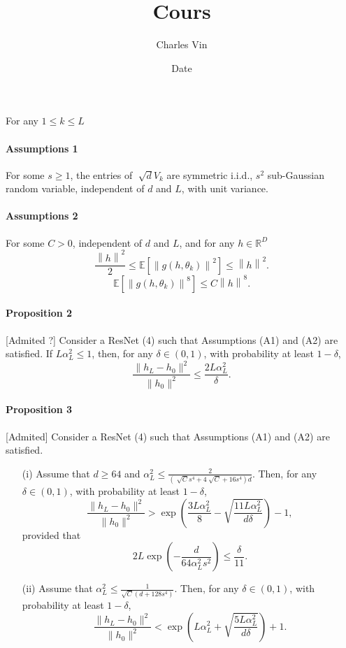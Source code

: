 \documentclass{article}
\title{Cours}
\author{Charles Vin}
\date{Date}
\theoremstyle{plain}%
\theoremstyle{definition}
\theoremstyle{remark}
\begin{document}
For any $ 1 \leq  k \leq L  $ 

\paragraph*{Assumptions 1}
For some $ s \geq 1 $, the entries of $ \sqrt[]{d}V_k $ are symmetric i.i.d., $ s^2 $ sub-Gaussian random variable, independent of $ d $ and $ L $, with unit variance. 

\paragraph*{Assumptions 2}
For some $ C > 0 $, independent of $ d $ and $ L $, and for any $ h \in \mathbb{R}^D  $ 
\[
    \frac{\left\| h \right\| ^2}{2 } \leq  \mathbb{E }[ \left\|  g(h, \theta _ k ) \right\| ^2 ] \leq \left\| h \right\| ^2
.\]
\[
    \mathbb{E } [\left\| g(h, \theta _k)  \right\| ^8 ]\leq C \left\| h  \right\| ^8
.\]

\paragraph*{Proposition 2}[Admited ?]  Consider a ResNet (4) such that Assumptions (A1) and (A2) are satisfied.
If \( L\alpha_L^2 \leq 1 \), then, for any \( \delta \in (0, 1) \), with probability at least \( 1 - \delta \),
\[
\frac{\|h_L - h_0\|^2}{\|h_0\|^2} \leq \frac{2L\alpha_L^2}{\delta}.
\]

\paragraph*{Proposition 3}[Admited] Consider a ResNet (4) such that Assumptions (A1) and (A2) are satisfied.
\begin{itemize}
    \item[(i)] Assume that $d \geq 64$ and $ \alpha _L ^2 \leq  \frac{2 }{(\sqrt[]{C } s^4 + 4 \sqrt[]{C } + 16 s ^4)d}$. Then, for any $\delta \in (0, 1)$, with probability at least $1 - \delta$,
    \[
    \frac{\|h_L - h_0\|^2}{\|h_0\|^2} > \exp\left(\frac{3L\alpha_L^2}{8} - \sqrt{\frac{11L\alpha_L^2}{d\delta}}\right) - 1,
    \]
    provided that
    \[
    2L \exp\left(-\frac{d}{64\alpha_L^2s^2}\right) \leq \frac{\delta}{11}.
    \]

    \item[(ii)] Assume that $\alpha_L^2 \leq \frac{1}{\sqrt{C}(d + 128s^4)}$. Then, for any $\delta \in (0, 1)$, with probability at least $1 - \delta$,
    \[
    \frac{\|h_L - h_0\|^2}{\|h_0\|^2} < \exp\left(L\alpha_L^2 + \sqrt{\frac{5L\alpha_L^2}{d\delta}}\right) + 1.
    \]
\end{itemize}
\end{document}

